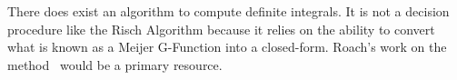 There does exist an algorithm to compute definite integrals.  It is not
a decision procedure like the Risch Algorithm because it relies on the
ability to convert what is known as a Meijer G-Function into a
closed-form.  Roach's work on the method~\cite{roach1997meijerg} would
be a primary resource.  